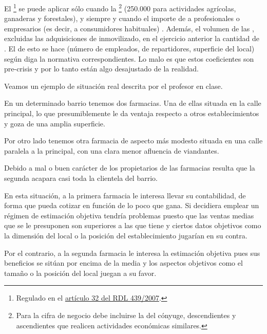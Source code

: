 \documentclass[nochap,palatino,shortheader]{apuntes}
\begin{document}
El \footnote{Regulado en el \href{https://www.boe.es/buscar/act.php?id=BOE-A-2007-6820}{artículo 32 del RDL 439/2007}.} se puede aplicar sólo cuando la \footnote{Para la cifra de negocio debe incluirse la del cónyuge, descendientes y ascendientes que realicen actividades económicas similares.}  (250.000 para actividades agrícolas, ganaderas y forestales), y siempre y cuando el importe de  a profesionales o empresarios (es decir, a consumidores habituales) .
Además, el volumen de las , excluidas las adquisiciones de inmovilizado, en el ejercicio anterior  la cantidad de .
El  de esto se hace  (número de empleados, de repartidores, superficie del local) según diga la normativa correspondientes.
Lo malo es que estos coeficientes son pre-crisis y por lo tanto están algo desajustado de la realidad.%

\begin{example}
Veamos un ejemplo de situación real descrita por el profesor en clase.

En un determinado barrio tenemos dos farmacias. Una de ellas situada en la calle principal, lo que presumiblemente le da ventaja respecto a otros establecimientos y goza de una amplia superficie.

Por otro lado tenemos otra farmacia de aspecto más modesto situada en una calle paralela a la principal, con una clara menor afluencia de viandantes.

Debido a mal o buen carácter de los propietarios de las farmacias resulta que la segunda acapara casi toda la clientela del barrio.

En esta situación, a la primera farmacia le interesa llevar su contabilidad, de forma que pueda cotizar en función de lo poco que gana. Si decidiera emplear un régimen de estimación objetiva tendría problemas puesto que las ventas medias que se le presuponen son superiores a las que tiene y ciertos datos objetivos como la dimensión del local o la posición del establecimiento jugarían en su contra.

Por el contrario, a la segunda farmacia le interesa la estimación objetiva pues sus beneficios se sitúan por encima de la media y los aspectos objetivos como el tamaño o la posición del local juegan a su favor.
\end{example}
\end{document}
